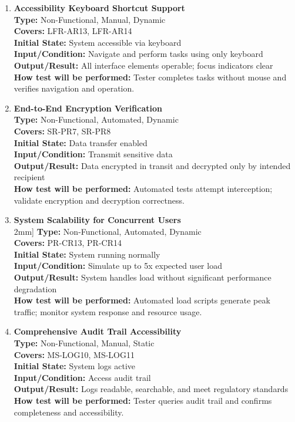 \documentclass[12pt, titlepage]{article}
\begin{document}
\begin{enumerate}[label=NFR-ST \arabic*., wide=0pt, leftmargin=*]
  \item \textbf{Accessibility Keyboard Shortcut Support} \\[2mm]
    \textbf{Type:} Non-Functional, Manual, Dynamic \\
    \textbf{Covers:} LFR-AR13, LFR-AR14 \\
    \textbf{Initial State:} System accessible via keyboard \\
    \textbf{Input/Condition:} Navigate and perform tasks using only keyboard \\
    \textbf{Output/Result:} All interface elements operable; focus
    indicators clear \\[2mm]
    \textbf{How test will be performed:} Tester completes tasks
    without mouse and verifies navigation and operation.

  \item \textbf{End-to-End Encryption Verification} \\[2mm]
    \textbf{Type:} Non-Functional, Automated, Dynamic \\
    \textbf{Covers:} SR-PR7, SR-PR8 \\
    \textbf{Initial State:} Data transfer enabled \\
    \textbf{Input/Condition:} Transmit sensitive data \\
    \textbf{Output/Result:} Data encrypted in transit and decrypted
    only by intended recipient \\[2mm]
    \textbf{How test will be performed:} Automated tests attempt
    interception; validate encryption and decryption correctness.

\item \textbf{System Scalability for Concurrent Users} \\2mm]
  \textbf{Type:} Non-Functional, Automated, Dynamic \\
  \textbf{Covers:} PR-CR13, PR-CR14 \\
  \textbf{Initial State:} System running normally \\
  \textbf{Input/Condition:} Simulate up to 5x expected user load \\
  \textbf{Output/Result:} System handles load without significant
  performance degradation \\[2mm]
  \textbf{How test will be performed:} Automated load scripts
  generate peak traffic; monitor system response and resource usage.

\item \textbf{Comprehensive Audit Trail Accessibility} \\[2mm]
  \textbf{Type:} Non-Functional, Manual, Static \\
  \textbf{Covers:} MS-LOG10, MS-LOG11 \\
  \textbf{Initial State:} System logs active \\
  \textbf{Input/Condition:} Access audit trail \\
  \textbf{Output/Result:} Logs readable, searchable, and meet
  regulatory standards \\[2mm]
  \textbf{How test will be performed:} Tester queries audit trail
  and confirms completeness and accessibility.


\end{enumerate}
\end{document}
